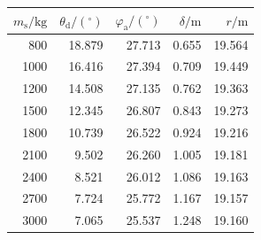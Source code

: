 \begin{tabular}{rrrrr}
\toprule
$m_{\mathrm s}/\mathrm{kg}$ & $\theta_{\mathrm d}/(^\circ)$ & $\varphi_{\mathrm a}/(^\circ)$ & $\delta/\mathrm m$ & $r/\mathrm m$ \\
\midrule
800 & 18.879 & 27.713 & 0.655 & 19.564 \\
1000 & 16.416 & 27.394 & 0.709 & 19.449 \\
1200 & 14.508 & 27.135 & 0.762 & 19.363 \\
1500 & 12.345 & 26.807 & 0.843 & 19.273 \\
1800 & 10.739 & 26.522 & 0.924 & 19.216 \\
2100 & 9.502 & 26.260 & 1.005 & 19.181 \\
2400 & 8.521 & 26.012 & 1.086 & 19.163 \\
2700 & 7.724 & 25.772 & 1.167 & 19.157 \\
3000 & 7.065 & 25.537 & 1.248 & 19.160 \\
\bottomrule
\end{tabular}
